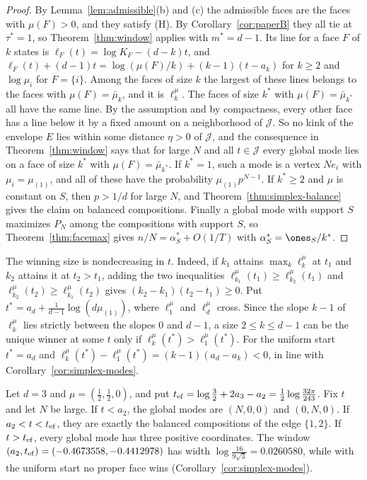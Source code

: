 \begin{proof}
By Lemma~\ref{lem:admissible}(b) and (c) the admissible faces are the faces with $\mu(F)>0$,
and they satisfy (H). By Corollary~\ref{cor:paperB} they all tie at $\tau^*=1$, so
Theorem~\ref{thm:window} applies with $m^*=d-1$. Its line for a face $F$ of $k$ states is
$\ell_F(t)=\log K_F-(d-k)t$, and $\ell_F(t)+(d-1)t=\log(\mu(F)/k)+(k-1)(t-a_k)$ for $k\ge2$ and
$\log\mu_i$ for $F=\{i\}$. Among the faces of size $k$ the largest of these lines belongs to the
faces with $\mu(F)=\bar\mu_k$, and it is $\ell^\mu_k$. The faces of size $k^*$ with
$\mu(F)=\bar\mu_{k^*}$ all have the same line. By the assumption and by compactness, every other
face has a line below it by a fixed amount on a neighborhood of $\mathcal J$. So no kink of the
envelope $E$ lies within some distance $\eta>0$ of $\mathcal J$, and the consequence in
Theorem~\ref{thm:window} says that for large $N$ and all $t\in\mathcal J$ every global mode lies
on a face of size $k^*$ with $\mu(F)=\bar\mu_{k^*}$. If $k^*=1$, such a mode is a vertex $Ne_i$
with $\mu_i=\mu_{(1)}$, and all of these have the probability $\mu_{(1)}p^{N-1}$. If $k^*\ge2$ and
$\mu$ is constant on $S$, then $p>1/d$ for large $N$, and Theorem~\ref{thm:simplex-balance} gives
the claim on balanced compositions. Finally a global mode with support $S$ maximizes $P_N$ among the compositions
with support $S$, so Theorem~\ref{thm:facemax} gives $n/N=\alpha^*_S+O(1/T)$ with
$\alpha^*_S=\ones_S/k^*$.
\end{proof}

\begin{remark}\label{rem:start-lines}
The winning size is nondecreasing in $t$. Indeed, if $k_1$ attains
$\max_k\ell^\mu_k$ at $t_1$ and $k_2$ attains it at $t_2>t_1$, adding the two
inequalities $\ell^\mu_{k_1}(t_1)\ge\ell^\mu_{k_2}(t_1)$ and
$\ell^\mu_{k_2}(t_2)\ge\ell^\mu_{k_1}(t_2)$ gives $(k_2-k_1)(t_2-t_1)\ge0$. Put
$t^*=a_d+\frac1{d-1}\log(d\mu_{(1)})$, where $\ell^\mu_1$ and $\ell^\mu_d$ cross.
Since the slope $k-1$ of $\ell^\mu_k$ lies strictly between the slopes $0$ and
$d-1$, a size $2\le k\le d-1$ can be the unique winner at some $t$ only if
$\ell^\mu_k(t^*)>\ell^\mu_1(t^*)$. For the uniform start $t^*=a_d$ and
$\ell^\mu_k(t^*)-\ell^\mu_1(t^*)=(k-1)(a_d-a_k)<0$, in line with
Corollary~\ref{cor:simplex-modes}.
\end{remark}

\begin{example}\label{ex:K3-start}
Let $d=3$ and $\mu=(\frac12,\frac12,0)$, and put
$t_{\rm ef}=\log\frac32+2a_3-a_2=\frac12\log\frac{32\pi}{243}$. Fix $t$ and let
$N$ be large. If $t<a_2$, the global modes are $(N,0,0)$ and $(0,N,0)$. If
$a_2<t<t_{\rm ef}$, they are exactly the balanced compositions of the edge $\{1,2\}$. If
$t>t_{\rm ef}$, every global mode has three positive coordinates. The window
$(a_2,t_{\rm ef})=(-0.4673558,-0.4412978)$ has width
$\log\frac{16}{9\sqrt3}=0.0260580$, while with the uniform start no proper face
wins (Corollary~\ref{cor:simplex-modes}).
\end{example}

